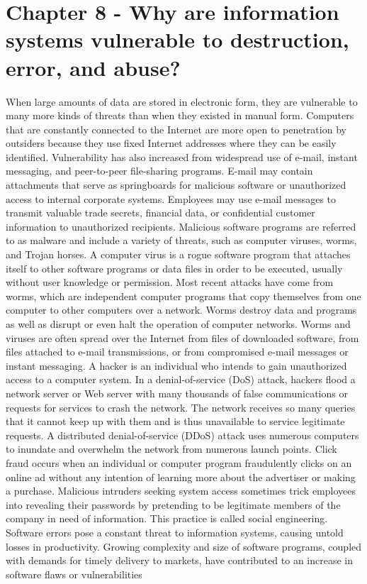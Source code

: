 \documentclass[12pt]{article}
\begin{document}
\section{Chapter 8 - Why are information systems vulnerable to destruction, error, and abuse?}
When large amounts of data are stored in electronic form, they are vulnerable to many more kinds of threats than when they existed in manual form. Computers that are constantly connected to the Internet are more open to penetration by outsiders because they use fixed Internet addresses where they can be easily identified.
Vulnerability has also increased from widespread use of e-mail, instant messaging, and peer-to-peer file-sharing programs. E-mail may contain attachments that serve as springboards for malicious software or unauthorized access to internal corporate systems. Employees may use e-mail messages to transmit valuable trade secrets, financial data, or confidential customer information to unauthorized recipients. Malicious software programs are referred to as malware and include a variety of threats, such as computer viruses, worms, and Trojan horses. A computer virus is a rogue software program that attaches itself to other software programs or data files in order to be executed, usually without user knowledge or permission. Most recent attacks have come from worms, which are independent computer programs that copy themselves from one computer to other computers over a network. Worms destroy data and programs as well as disrupt or even halt the operation of computer networks. Worms and viruses are often spread over the Internet from files of downloaded software, from files attached to e-mail transmissions, or from compromised e-mail messages or instant messaging. A hacker is an individual who intends to gain unauthorized access to a computer system. In a denial-of-service (DoS) attack, hackers flood a network server or Web server with many thousands of false communications or requests for services to crash the network. The network receives so many queries that it cannot keep up with them and is thus unavailable to service legitimate requests. A distributed denial-of-service (DDoS) attack uses numerous computers to inundate and overwhelm the network from numerous launch points. Click fraud occurs when an individual or computer program fraudulently clicks on an online ad without any intention of learning more about the advertiser or making a purchase. Malicious intruders seeking system access sometimes trick employees into revealing their passwords by pretending to be legitimate members of the company in need of information. This practice is called social engineering. Software errors pose a constant threat to information systems, causing untold losses in productivity. Growing complexity and size of software programs, coupled with demands for timely delivery to markets, have contributed to an increase in software flaws or vulnerabilities
\end{document}
